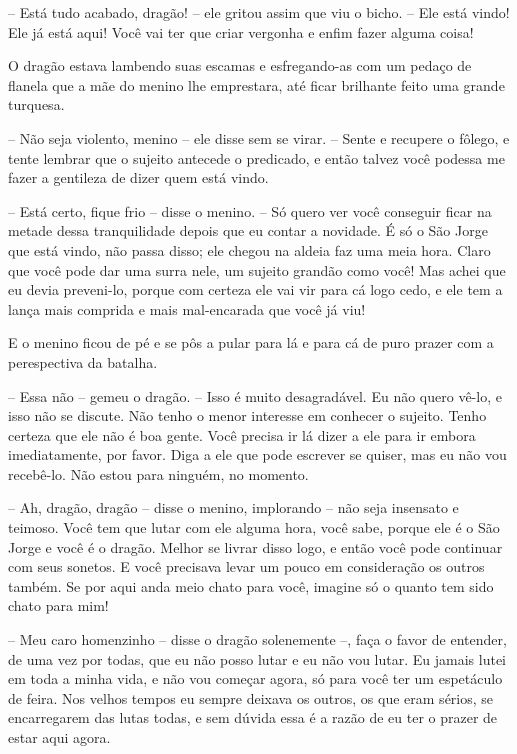 -- Está tudo acabado, dragão! -- ele gritou assim que viu o bicho. -- Ele
está vindo! Ele já está aqui! Você vai ter que criar vergonha e enfim
fazer alguma coisa!

O dragão estava lambendo suas escamas e esfregando-as com um pedaço de
flanela que a mãe do menino lhe emprestara, até ficar brilhante feito
uma grande turquesa.

-- Não seja violento, menino -- ele disse sem se virar. -- Sente e
recupere o fôlego, e tente lembrar que o sujeito antecede o
predicado, e então talvez você podessa me fazer a gentileza de dizer
quem está vindo.

-- Está certo, fique frio -- disse o menino. -- Só quero ver você
conseguir ficar na metade dessa tranquilidade depois que eu contar a
novidade. É só o São Jorge que está vindo, não passa disso; ele
chegou na aldeia faz uma meia hora. Claro que você pode dar uma surra
nele, um sujeito grandão como você! Mas achei que eu devia
preveni-lo, porque com certeza ele vai vir para cá logo cedo, e ele
tem a lança mais comprida e mais mal-encarada que você já viu!

E o menino ficou de pé e se pôs a pular para lá e para cá de puro
prazer com a perespectiva da batalha.

-- Essa não -- gemeu o dragão. -- Isso é muito desagradável. Eu não quero
vê-lo, e isso não se discute. Não tenho o menor interesse em conhecer
o sujeito. Tenho certeza que ele não é boa gente. Você precisa ir lá
dizer a ele para ir embora imediatamente, por favor. Diga a ele que
pode escrever se quiser, mas eu não vou recebê-lo. Não estou para
ninguém, no momento. 

-- Ah, dragão, dragão -- disse o menino, implorando -- não seja insensato
e teimoso. Você tem que lutar com ele alguma hora, você sabe, porque
ele é o São Jorge e você é o dragão. Melhor se livrar disso logo, e
então você pode continuar com seus sonetos. E você precisava levar um
pouco em consideração os outros também. Se por aqui anda meio chato
para você, imagine só o quanto tem sido chato para mim!

-- Meu caro homenzinho -- disse o dragão solenemente --, faça o favor de
entender, de uma vez por todas, que eu não posso lutar e eu não vou
lutar. Eu jamais lutei em toda a minha vida, e não vou começar agora,
só para você ter um espetáculo de feira. Nos velhos tempos eu sempre
deixava os outros, os que eram sérios, se encarregarem das lutas
todas, e sem dúvida essa é a razão de eu ter o prazer de estar aqui
agora.

